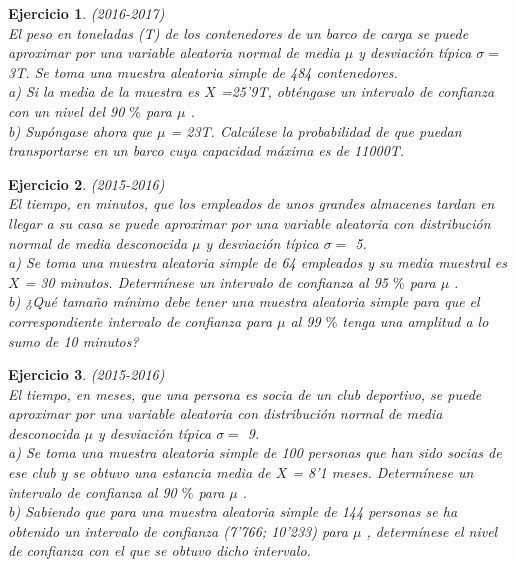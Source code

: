 \documentclass[12pt, a4paper]{amsart}
\newtheorem{ejer}{Ejercicio}
\begin{document}
\begin{ejer}\em (2016-2017)\\
El peso en toneladas (T) de los contenedores de un barco de carga se puede aproximar por una variable
aleatoria normal de media $\mu$ y desviación típica  $\sigma =$ 3T. Se toma una muestra aleatoria simple de 484
contenedores.\\
a) Si la media de la muestra es $X$ =25’9T, obténgase un intervalo de confianza con un nivel del 90 $\%$ para $\mu$ .\\
b) Supóngase ahora que $\mu$ = 23T. Calcúlese la probabilidad de que puedan transportarse en un barco cuya
capacidad máxima es de 11000T.
\end{ejer}

\begin{ejer}\em (2015-2016)\\
El tiempo, en minutos, que los empleados de unos grandes
almacenes tardan en llegar a su casa se puede aproximar por una variable aleatoria con distribución normal
de media desconocida $\mu$ y desviación típica  $\sigma =$ 5.\\
a) Se toma una muestra aleatoria simple de 64 empleados y su media muestral es $X$ = 30 minutos. Determínese
un intervalo de confianza al 95 $\%$ para $\mu$ .\\
b) ¿Qué tamaño mínimo debe tener una muestra aleatoria simple para que el correspondiente intervalo de
confianza para $\mu$ al 99 $\%$ tenga una amplitud a lo sumo de 10 minutos?
\end{ejer}

\begin{ejer}\em (2015-2016)\\
El tiempo, en meses, que una persona es socia de un club deportivo, se puede aproximar por una variable
aleatoria con distribución normal de media desconocida $\mu$ y desviación típica  $\sigma =$ 9.\\
a) Se toma una muestra aleatoria simple de 100 personas que han sido socias de ese club y se obtuvo una
estancia media de $X$ = 8’1 meses. Determínese un intervalo de confianza al 90 $\%$ para $\mu$ .\\
b) Sabiendo que para una muestra aleatoria simple de 144 personas se ha obtenido un intervalo de confianza
(7’766; 10’233) para $\mu$ , determínese el nivel de confianza con el que se obtuvo dicho intervalo.
\end{ejer}
\end{document}
